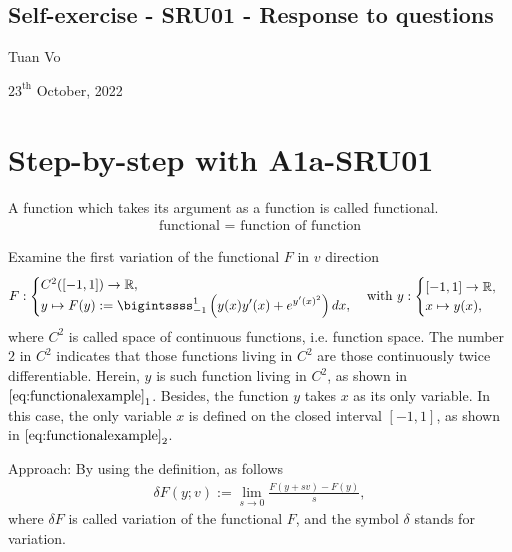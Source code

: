 \documentclass[12pt]{article}
\begin{document}
\begin{center}
	\section*{Self-exercise - SRU01 - Response to questions}
\end{center}
\begin{center}
	Tuan Vo
\end{center}
\begin{center}
	$23^{\text{th}}$ October, 2022
\end{center}
\section{Step-by-step with A1a-SRU01}
A function which takes its argument as a function is called 
functional.
\begin{align}
	\boxed{
		\text{functional = function of function}
	}
\end{align}
\begin{exampleboxed}
	Examine the first variation of the functional $F$ in $v$ direction
	\begin{align}
		\label{eq:functionalexample}
		F:
		\begin{cases}
			C^2([-1,1]) \rightarrow \mathbb{R}, \\
			\displaystyle
			y \mapsto
			F(y):= \bigintssss_{-1}^1
			\left( y(x) y'(x) + e^{{y^\prime}(x)^2} \right)dx,
		\end{cases}
		\text{with}\
		y:
		\begin{cases}
			[-1,1] \rightarrow \mathbb{R}, \\
			x \mapsto y(x),
		\end{cases}
	\end{align}
	where $C^2$ is called space of continuous functions, i.e. function space.
	The number $2$ in $C^2$ indicates that those functions
	living in $C^2$ are those continuously twice differentiable.
	Herein, $y$ is such function living in $C^2$,
	as shown in $\eqref{eq:functionalexample}_{1}$.
	Besides, the function $y$ takes $x$ as its only variable.
	In this case, the only variable $x$
	is defined on the closed interval $[-1,1]$, as shown in
	$\eqref{eq:functionalexample}_{2}$.
\end{exampleboxed}

Approach: By using the definition, as follows 
\begin{align}
	\label{eq:variationformular}
	\boxed{
		\delta F(y;v) := \lim_{s\to 0}\frac{F(y+sv)-F(y)}{s},
	}
\end{align}
where $\delta F$ is called variation of the functional $F$, 
and the symbol $\delta$ stands for variation.
\end{document}
